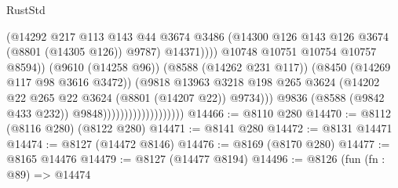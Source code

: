\begin{lexlean}{RustStd}
\begin{coremodule}
                                                      (@14292
                                                        @217
                                                        @113
                                                        @143
                                                        @44
                                                        @3674
                                                        @3486
                                                        (@14300
                                                          @126
                                                          @143
                                                          @126
                                                          @3674
                                                          (@8801 (@14305 @126))
                                                          @9787)
                                                        @14371))))
                                                @10748
                                                @10751
                                                @10754
                                                @10757
                                                @8594))
                                            (@9610 (@14258 @96))
                                            (@8588 (@14262 @231 @117))
                                            (@8450 (@14269 @117 @98 @3616 @3472))
                                            (@9818
                                              @13963
                                              @3218
                                              @198
                                              @265
                                              @3624
                                              (@14202
                                                @22
                                                @265
                                                @22
                                                @3624
                                                (@8801 (@14207 @22))
                                                @9734)))
                                          @9836
                                          (@8588 (@9842 @433 @232))
                                          @9848)))))))))))))))))))
@14466 := @8110 @280
@14470 := @8112 (@8116 @280) (@8122 @280)
@14471 := @8141 @280
@14472 := @8131 @14471
@14474 := @8127 (@14472 @8146)
@14476 := @8169 (@8170 @280)
@14477 := @8165 @14476
@14479 := @8127 (@14477 @8194)
@14496 := @8126
    (fun (fn : @89) =>
    @14474

\end{coremodule}
\end{lexlean}
